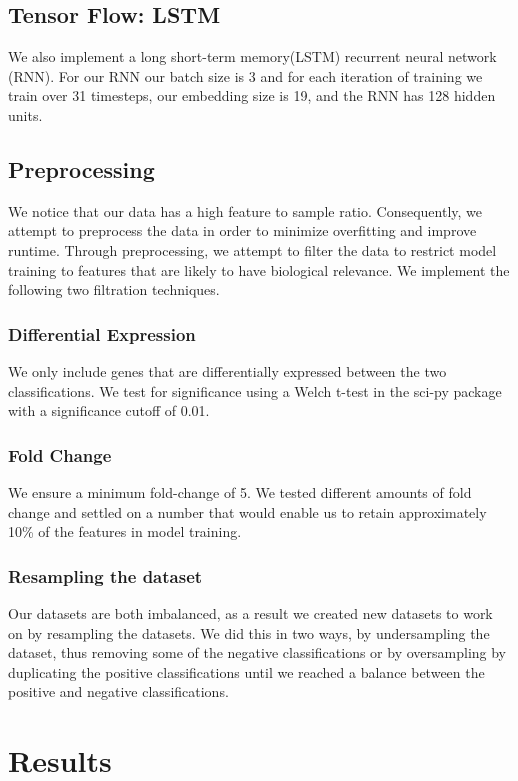 \documentclass[12pt]{scrartcl}
\begin{document}
    
    \subsection{Tensor Flow: LSTM}
    We also implement a long short-term memory(LSTM) recurrent neural network (RNN). For our RNN our batch size is 3 and for each iteration of training we train over 31 timesteps, our embedding size is 19, and the RNN has 128 hidden units. 
 
    \subsection{Preprocessing}
We notice that our data has a high feature to sample ratio. Consequently, we attempt to preprocess the data in order to minimize overfitting and improve runtime. Through preprocessing, we attempt to filter the data to restrict model training to features that are likely to have biological relevance. We implement the following two filtration techniques.

    \subsubsection{Differential Expression}
We only include genes that are differentially expressed between the two classifications. We test for significance using a Welch t-test in the sci-py package with a significance cutoff of 0.01. 
    \subsubsection{Fold Change}
We ensure a minimum fold-change of 5. We tested different amounts of fold change and settled on a number that would enable us to retain approximately 10\% of the features in model training.

    \subsubsection{Resampling the dataset}
    Our datasets are both imbalanced, as a result we created new datasets to work on by resampling the datasets. We did this in two ways, by undersampling the dataset, thus removing some of the negative classifications or by oversampling by duplicating the positive classifications until we reached a balance between the positive and negative classifications. 


    \section{Results}
\end{document}

